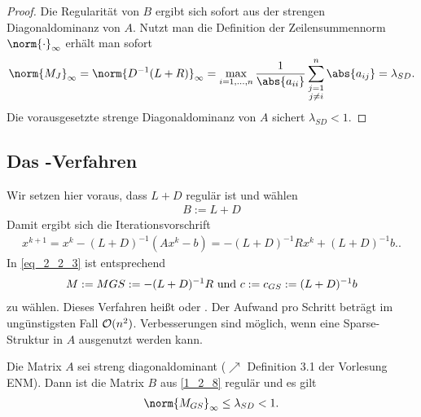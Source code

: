 \begin{proof}
	Die Regularität von $B$ ergibt sich sofort aus der strengen Diagonaldominanz von $A$. Nutzt man die Definition der Zeilensummennorm $\norm{\cdot}_{\infty}$ erhält man sofort
	\begin{align}
		\norm{M_J}_{\infty} = \norm{D^{-1}(L+R)}_{\infty} =\max_{i = 1,\dots,n} \frac{1}{\abs{a_{ii}}} \sum_{\substack{j =1 \\ j\neq i}}^n \abs{a_{ij}}  = \lambda_{SD}.\notag
	\end{align}
	Die vorausgesetzte strenge Diagonaldominanz von $A$ sichert $\lambda_{SD} < 1$.
\end{proof}

\subsection{Das -Verfahren}
Wir setzen hier voraus, dass $L + D$ regulär ist und wählen
\begin{align}
	B := L + D \label{1_2_8}
\end{align}
Damit ergibt sich die Iterationsvorschrift
\begin{align}
	x^{k+1} = x^k - (L+D)^{-1}(Ax^k - b) = - (L+D)^{-1}R x^k + (L+D)^{-1}b. \label{1_2_9}.
\end{align}
In \cref{eq_2_2_3} ist entsprechend
\begin{align}
	M:= M{GS} := - (L+D)^{-1}R \text{ und } c:= c_{GS} := (L+D)^{-1}b \notag
\end{align}
zu wählen. Dieses Verfahren heißt  oder . Der Aufwand pro Schritt beträgt im ungünstigsten Fall $\operatorname{\mathcal{O}}(n^2)$. Verbesserungen sind möglich, wenn eine Sparse-Struktur in $A$ ausgenutzt werden kann.

\begin{proposition}
	Die Matrix $A$ sei streng diagonaldominant ($\nearrow$ Definition 3.1 der Vorlesung ENM). Dann ist die Matrix $B$ aus \cref{1_2_8} regulär und es gilt
	\begin{align}
		\norm{M_{GS}}_{\infty} \le \lambda_{SD} <1. \notag
	\end{align}
\end{proposition}

